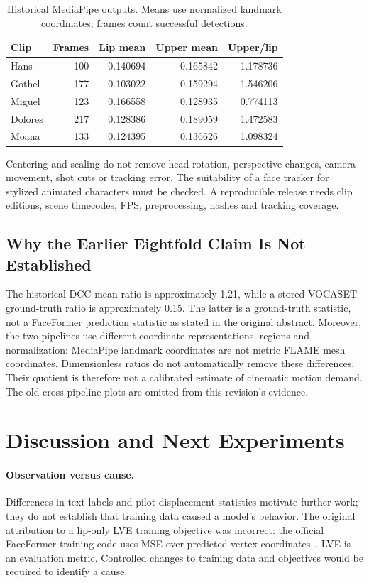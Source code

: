 \documentclass[10pt]{article}
\begin{document}
\begin{table}[H]
\centering\small
\caption{Historical MediaPipe outputs. Means use normalized landmark coordinates; frames count successful detections.}
\label{tab:clips}
\begin{tabular}{lrrrr}
\toprule Clip & Frames & Lip mean & Upper mean & Upper/lip \\\midrule
Hans & 100 & 0.140694 & 0.165842 & 1.178736 \\
Gothel & 177 & 0.103022 & 0.159294 & 1.546206 \\
Miguel & 123 & 0.166558 & 0.128935 & 0.774113 \\
Dolores & 217 & 0.128386 & 0.189059 & 1.472583 \\
Moana & 133 & 0.124395 & 0.136626 & 1.098324 \\\bottomrule
\end{tabular}
\end{table}

Centering and scaling do not remove head rotation, perspective changes, camera
movement, shot cuts or tracking error. The suitability of a face tracker for
stylized animated characters must be checked. A reproducible release needs clip
editions, scene timecodes, FPS, preprocessing, hashes and tracking coverage.

\subsection{Why the Earlier Eightfold Claim Is Not Established}
The historical DCC mean ratio is approximately 1.21, while a stored VOCASET
ground-truth ratio is approximately 0.15. The latter is a ground-truth statistic,
not a FaceFormer prediction statistic as stated in the original abstract.
Moreover, the two pipelines use different coordinate representations, regions
and normalization: MediaPipe landmark coordinates are not metric FLAME mesh
coordinates. Dimensionless ratios do not automatically remove these differences.
Their quotient is therefore not a calibrated estimate of cinematic motion demand.
The old cross-pipeline plots are omitted from this revision's evidence.

\section{Discussion and Next Experiments}
\paragraph{Observation versus cause.}
Differences in text labels and pilot displacement statistics motivate further work;
they do not establish that training data caused a model's behavior. The original
attribution to a lip-only LVE training objective was incorrect: the official
FaceFormer training code uses MSE over predicted vertex coordinates~\cite{ffcode}.
LVE is an evaluation metric. Controlled changes to training data and objectives
would be required to identify a cause.
\end{document}

